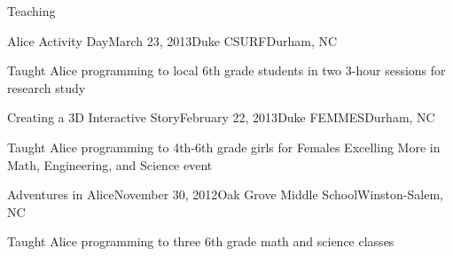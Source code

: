 \documentclass{resume} %
\begin{document}
\begin{rSection}{Teaching}

\begin{rSubsection}{Alice Activity Day}{March 23, 2013}{Duke CSURF}{Durham, NC}
\item Taught Alice programming to local 6th grade students in two 3-hour sessions for research study
\end{rSubsection}



\begin{rSubsection}{Creating a 3D Interactive Story}{February 22, 2013}{Duke FEMMES}{Durham, NC}
\item Taught Alice programming to 4th-6th grade girls for Females Excelling More in Math, Engineering, and Science event
\end{rSubsection}



\begin{rSubsection}{Adventures in Alice}{November 30, 2012}{Oak Grove Middle School}{Winston-Salem, NC}
\item Taught Alice programming to three 6th grade math and science classes
\end{rSubsection}

\end{rSection}
\end{document}
